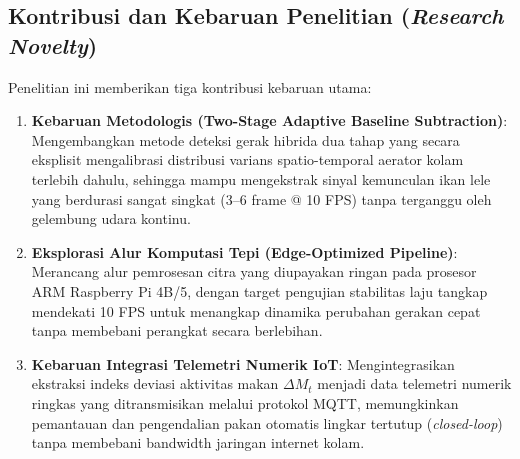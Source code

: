 \subsection{Kontribusi dan Kebaruan Penelitian (\textit{Research Novelty})}
Penelitian ini memberikan tiga kontribusi kebaruan utama:
\begin{enumerate}
    \item \textbf{Kebaruan Metodologis (Two-Stage Adaptive Baseline Subtraction)}: Mengembangkan metode deteksi gerak hibrida dua tahap yang secara eksplisit mengalibrasi distribusi varians spatio-temporal aerator kolam terlebih dahulu, sehingga mampu mengekstrak sinyal kemunculan ikan lele yang berdurasi sangat singkat (3--6 frame @ 10 FPS) tanpa terganggu oleh gelembung udara kontinu.
    \item \textbf{Eksplorasi Alur Komputasi Tepi (Edge-Optimized Pipeline)}: Merancang alur pemrosesan citra yang diupayakan ringan pada prosesor ARM Raspberry Pi 4B/5, dengan target pengujian stabilitas laju tangkap mendekati 10 FPS untuk menangkap dinamika perubahan gerakan cepat tanpa membebani perangkat secara berlebihan.
    \item \textbf{Kebaruan Integrasi Telemetri Numerik IoT}: Mengintegrasikan ekstraksi indeks deviasi aktivitas makan $\Delta M_t$ menjadi data telemetri numerik ringkas yang ditransmisikan melalui protokol MQTT, memungkinkan pemantauan dan pengendalian pakan otomatis lingkar tertutup (\textit{closed-loop}) tanpa membebani bandwidth jaringan internet kolam.
\end{enumerate}
